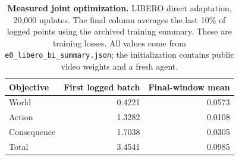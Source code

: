 \begin{table}[t]
\centering\small
\begin{tabular}{lrr}
\toprule
Objective & First logged batch & Final-window mean \\
\midrule
World & 0.4221 & 0.0573 \\
Action & 1.3282 & 0.0108 \\
Consequence & 1.7038 & 0.0305 \\
Total & 3.4541 & 0.0985 \\
\bottomrule
\end{tabular}
\caption{\textbf{Measured joint optimization.} LIBERO direct adaptation, 20,000 updates. The final column averages the last 10\% of logged points using the archived training summary. These are training losses. All values come from \texttt{e0\_libero\_bi\_summary.json}; the initialization contains public video weights and a fresh agent.}
\label{tab:optimization}
\end{table}

